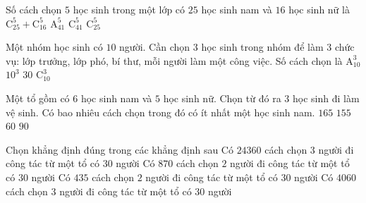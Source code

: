 \begin{ex}%
	Số cách chọn $5$ học sinh trong một lớp có $25$ học sinh nam  và $16$ học sinh nữ là
	 \choice
		{$\mathrm{C}_{25}^5+\mathrm{C}_{16}^5$} 
		{$\mathrm{A}_{41}^5$} 
		{\True  $\mathrm{C}_{41}^5$}
		{$\mathrm{C}_{25}^5$} 
\end{ex}

\begin{ex}%
	Một nhóm học sinh có $10$ người. Cần  chọn $3$ học sinh trong nhóm để làm $3$ chức vụ: lớp trưởng, lớp phó, bí thư, mỗi người làm một công việc. Số cách chọn là
	 \choice
		{\True $\mathrm{A}_{10}^3$} 
		{$10^3$} 
		 {$30$}
		 {$\mathrm{C}_{10}^3$}
\end{ex}

\begin{ex}%
	Một tổ gồm có $6$ học sinh nam và $5$ học sinh nữ. Chọn từ đó ra $3$ học sinh đi làm vệ sinh. Có bao nhiêu cách chọn trong đó có ít nhất một học sinh  nam.
	 \choice
		 {$165$}
		 {\True $155$}
		 {$60$}
		 {$90$}
\end{ex}


\begin{ex}%
	Chọn khẳng định đúng trong các  khẳng định sau
	\choiceTF 
		{Có $24360$ cách chọn $3$ người đi  công tác từ một tổ có $30$ người}
		{Có $870$ cách chọn $2$ người đi công  tác từ một tổ có $30$ người}
		{\True Có $435$ cách chọn $2$ người đi công  tác từ một tổ có $30$ người}
		{\True Có $4060$ cách chọn $3$ người đi công tác từ một tổ có  $30$ người}
\end{ex}

